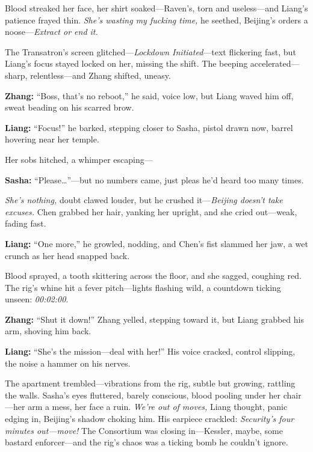 \documentclass[12pt]{book}
\begin{document}
Blood streaked her face, her shirt soaked—Raven’s, torn and useless—and Liang’s patience frayed thin. \emph{She’s wasting my fucking time,} he seethed, Beijing’s orders a noose—\emph{Extract or end it.}

The Transatron’s screen glitched—\emph{Lockdown Initiated}—text flickering fast, but Liang’s focus stayed locked on her, missing the shift. The beeping accelerated—sharp, relentless—and Zhang shifted, uneasy. 

\vspace{0.5em}
\textbf{Zhang:} “Boss, that’s no reboot,” he said, voice low, but Liang waved him off, sweat beading on his scarred brow.

\vspace{0.5em}
\textbf{Liang:} “Focus!” he barked, stepping closer to Sasha, pistol drawn now, barrel hovering near her temple.

Her sobs hitched, a whimper escaping— 

\vspace{0.5em}
\textbf{Sasha:} “Please…”—but no numbers came, just pleas he’d heard too many times.

\emph{She’s nothing,} doubt clawed louder, but he crushed it—\emph{Beijing doesn’t take excuses.} Chen grabbed her hair, yanking her upright, and she cried out—weak, fading fast. 

\vspace{0.5em}
\textbf{Liang:} “One more,” he growled, nodding, and Chen’s fist slammed her jaw, a wet crunch as her head snapped back.

Blood sprayed, a tooth skittering across the floor, and she sagged, coughing red. The rig’s whine hit a fever pitch—lights flashing wild, a countdown ticking unseen: \emph{00:02:00}. 

\vspace{0.5em}
\textbf{Zhang:} “Shut it down!” Zhang yelled, stepping toward it, but Liang grabbed his arm, shoving him back.

\vspace{0.5em}
\textbf{Liang:} “She’s the mission—deal with her!” His voice cracked, control slipping, the noise a hammer on his nerves.

The apartment trembled—vibrations from the rig, subtle but growing, rattling the walls. Sasha’s eyes fluttered, barely conscious, blood pooling under her chair—her arm a mess, her face a ruin. \emph{We’re out of moves,} Liang thought, panic edging in, Beijing’s shadow choking him. His earpiece crackled: \emph{Security’s four minutes out—move!} The Consortium was closing in—Kessler, maybe, some bastard enforcer—and the rig’s chaos was a ticking bomb he couldn’t ignore. 
\end{document}
